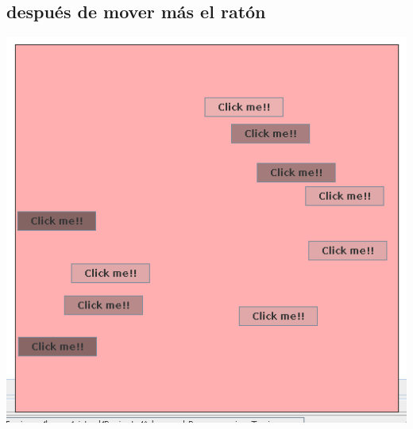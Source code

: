 \documentclass[12pt]{article}
\begin{document}
\subsection*{después de mover más el ratón}

\includegraphics[width=\textwidth]{Ejecucion2.png}
\end{document}
